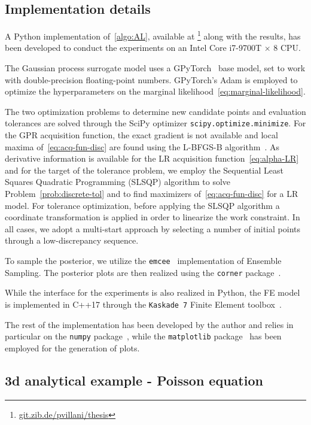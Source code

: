 \subsection{Implementation details}\label{sec:implementation}
A Python implementation of~\ref{algo:AL}, available at \footnote{\url{git.zib.de/pvillani/thesis}} along with the results, has been developed to conduct the experiments on an Intel Core i7-9700T × 8 CPU. \medskip

The Gaussian process surrogate model uses a GPyTorch~\cite{GPyTorchPaper} base model, set to work with double-precision floating-point numbers.
GPyTorch's Adam is employed to optimize the hyperparameters on the marginal likelihood~\eqref{eq:marginal-likelihood}. \medskip

The two optimization problems to determine new candidate points and evaluation tolerances are solved through the SciPy optimizer \texttt{scipy.optimize.minimize}. 
For the GPR acquisition function, the exact gradient is not available and local maxima of~\eqref{eq:acq-fun-disc} are found using the L-BFGS-B algorithm~\cite{ZhuBirdNocedal}. 
As derivative information is available for the LR acquisition function~\eqref{eq:alpha-LR} and for the target of the tolerance problem, we employ the Sequential Least Squares Quadratic Programming (SLSQP) algorithm to solve Problem~\eqref{prob:discrete-tol} and to find maximizers of~\eqref{eq:acq-fun-disc} for a LR model. 
For tolerance optimization, before applying the SLSQP algorithm a coordinate transformation is applied in order to linearize the work constraint. 
In all cases, we adopt a multi-start approach by selecting a number of initial points through a low-discrepancy sequence. \medskip

To sample the posterior, we utilize the \texttt{emcee}~\cite{emceePaper} implementation of Ensemble Sampling. The posterior plots are then realized using the \texttt{corner} package~\cite{corner}. \medskip

While the interface for the experiments is also realized in Python, the FE model is implemented in C++17 through the \texttt{Kaskade 7} Finite Element toolbox~\cite{GoetschelSchielaWeiser2021}.\medskip

The rest of the implementation has been developed by the author and relies in particular on the \texttt{numpy} package~\cite{numpy}, while the \texttt{matplotlib} package~\cite{matplotlib} has been employed for the generation of plots. 

\subsection{3d analytical example - Poisson equation}\label{sec:3dexp}

